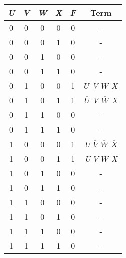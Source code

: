 \begin{tabular}{|c|c|c|c|c|c|}
\hline
\textit{\textbf{U}} & \textit{\textbf{V}} & \textit{\textbf{W}} & \textit{\textbf{X}} & \textit{\textbf{F}} & \textbf{Term}    \\ \hline
0                   & 0                   & 0                   & 0                   & 0                   & -                \\
0                   & 0                   & 0                   & 1                   & 0                   & -                \\
0                   & 0                   & 1                   & 0                   & 0                   & -                \\
0                   & 0                   & 1                   & 1                   & 0                   & -                \\
0                   & 1                   & 0                   & 0                   & 1                   & \textit{$\overline{U}$ V $\overline{W}$  $\overline{X}$} \\
0                   & 1                   & 0                   & 1                   & 1                   & \textit{$\overline{U}$ V $\overline{W}$ X}  \\
0                   & 1                   & 1                   & 0                   & 0                   & -                \\
0                   & 1                   & 1                   & 1                   & 0                   & -                \\
1                   & 0                   & 0                   & 0                   & 1                   & \textit{U $\overline{V}$ $\overline{W}$ $\overline{X}$} \\
1                   & 0                   & 0                   & 1                   & 1                   & \textit{U $\overline{V}$ $\overline{W}$ X}  \\
1                   & 0                   & 1                   & 0                   & 0                   & -                \\
1                   & 0                   & 1                   & 1                   & 0                   & -                \\
1                   & 1                   & 0                   & 0                   & 0                   & -                \\
1                   & 1                   & 0                   & 1                   & 0                   & -                \\
1                   & 1                   & 1                   & 0                   & 0                   & -                \\
1                   & 1                   & 1                   & 1                   & 0                   & -                \\ \hline
\end{tabular}
